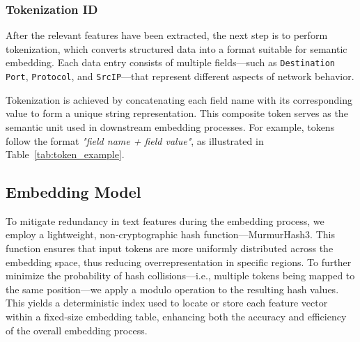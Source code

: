 \begin{ZhChapter}
\subsubsection{Tokenization ID}
After the relevant features have been extracted, the next step is to perform tokenization, which converts structured data into a format suitable for semantic embedding. Each data entry consists of multiple fields—such as \texttt{Destination Port}, \texttt{Protocol}, and \texttt{SrcIP}—that represent different aspects of network behavior.

Tokenization is achieved by concatenating each field name with its corresponding value to form a unique string representation. This composite token serves as the semantic unit used in downstream embedding processes. For example, tokens follow the format \textit{"field name + field value"}, as illustrated in Table~\ref{tab:token_example}.

 
\begin{table}[htbp]
    \centering
    \caption{Example of Tokenized Input Fields} \label{tab:token_example}
    \end{table}
    


\subsection{Embedding Model}
To mitigate redundancy in text features during the embedding process, we employ a lightweight, non-cryptographic hash function—MurmurHash3. This function ensures that input tokens are more uniformly distributed across the embedding space, thus reducing overrepresentation in specific regions. To further minimize the probability of hash collisions—i.e., multiple tokens being mapped to the same position—we apply a modulo operation to the resulting hash values. This yields a deterministic index used to locate or store each feature vector within a fixed-size embedding table, enhancing both the accuracy and efficiency of the overall embedding process.


\end{ZhChapter}

